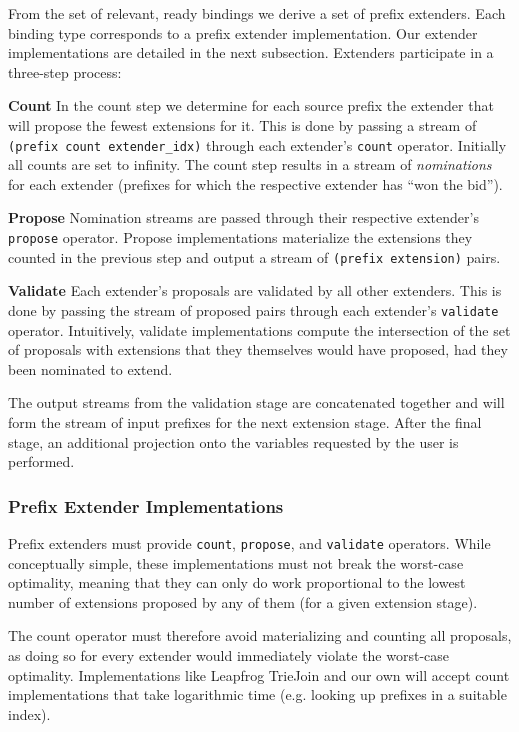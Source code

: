 \documentclass[../index.tex]{subfiles}
\begin{document}
From the set of relevant, ready bindings we derive a set of prefix
extenders. Each binding type corresponds to a prefix extender
implementation. Our extender implementations are detailed in the next
subsection. Extenders participate in a three-step process:

\textbf{Count} In the count step we determine for each source prefix
the extender that will propose the fewest extensions for it. This is
done by passing a stream of \texttt{(prefix count extender\_idx)}
through each extender's \texttt{count} operator. Initially all counts
are set to infinity. The count step results in a stream of
\emph{nominations} for each extender (prefixes for which the
respective extender has ``won the bid'').

\textbf{Propose} Nomination streams are passed through their
respective extender's \texttt{propose} operator. Propose
implementations materialize the extensions they counted in the
previous step and output a stream of \texttt{(prefix extension)}
pairs.

\textbf{Validate} Each extender's proposals are validated by all other
extenders. This is done by passing the stream of proposed pairs
through each extender's \texttt{validate} operator. Intuitively,
validate implementations compute the intersection of the set of
proposals with extensions that they themselves would have proposed,
had they been nominated to extend.

The output streams from the validation stage are concatenated together
and will form the stream of input prefixes for the next extension
stage. After the final stage, an additional projection onto the
variables requested by the user is performed.

\subsubsection{Prefix Extender Implementations}

Prefix extenders must provide \texttt{count}, \texttt{propose}, and
\texttt{validate} operators. While conceptually simple, these
implementations must not break the worst-case optimality, meaning that
they can only do work proportional to the lowest number of extensions
proposed by any of them (for a given extension stage).

The count operator must therefore avoid materializing and counting all
proposals, as doing so for every extender would immediately violate
the worst-case optimality. Implementations like Leapfrog TrieJoin and
our own will accept count implementations that take logarithmic time
(e.g. looking up prefixes in a suitable index).
\end{document}
